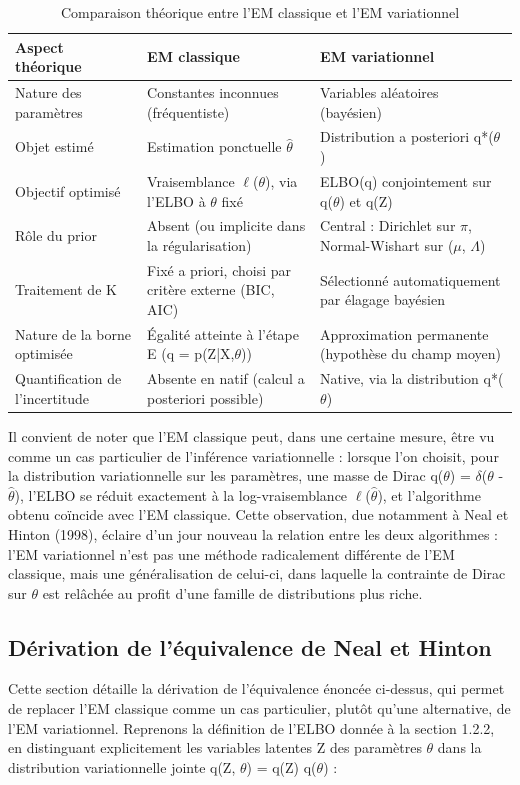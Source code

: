 \begin{table}[H]
\centering
\small
\setlength{\tabcolsep}{0.14cm}
\begin{tabular}{|p{4.84cm}|p{4.84cm}|p{4.84cm}|}
\hline
\textbf{Aspect théorique} & \textbf{EM classique} & \textbf{EM variationnel} \\
\hline
Nature des paramètres & Constantes inconnues (fréquentiste) & Variables aléatoires (bayésien) \\
\hline
Objet estimé & Estimation ponctuelle $\hat{\theta }$ & Distribution a posteriori q*($\theta $) \\
\hline
Objectif optimisé & Vraisemblance $\ell $($\theta $), via l'ELBO à $\theta $ fixé & ELBO(q) conjointement sur q($\theta $) et q(Z) \\
\hline
Rôle du prior & Absent (ou implicite dans la régularisation) & Central : Dirichlet sur $\pi $, Normal-Wishart sur ($\mu $, $\Lambda $) \\
\hline
Traitement de K & Fixé a priori, choisi par critère externe (BIC, AIC) & Sélectionné automatiquement par élagage bayésien \\
\hline
Nature de la borne optimisée & Égalité atteinte à l'étape E (q = p(Z|X,$\theta $)) & Approximation permanente (hypothèse du champ moyen) \\
\hline
Quantification de l'incertitude & Absente en natif (calcul a posteriori possible) & Native, via la distribution q*($\theta $) \\
\hline
\end{tabular}
\caption{Comparaison théorique entre l'EM classique et l'EM variationnel}
\label{tab:2_1}
\end{table}
Il convient de noter que l'EM classique peut, dans une certaine mesure, être vu comme un cas particulier de l'inférence variationnelle : lorsque l'on choisit, pour la distribution variationnelle sur les paramètres, une masse de Dirac q($\theta $) = $\delta $($\theta $ - $\hat{\theta }$), l'ELBO se réduit exactement à la log-vraisemblance $\ell $($\hat{\theta }$), et l'algorithme obtenu coïncide avec l'EM classique. Cette observation, due notamment à Neal et Hinton (1998), éclaire d'un jour nouveau la relation entre les deux algorithmes : l'EM variationnel n'est pas une méthode radicalement différente de l'EM classique, mais une généralisation de celui-ci, dans laquelle la contrainte de Dirac sur $\theta $ est relâchée au profit d'une famille de distributions plus riche.

\subsection{Dérivation de l'équivalence de Neal et Hinton}
Cette section détaille la dérivation de l'équivalence énoncée ci-dessus, qui permet de replacer l'EM classique comme un cas particulier, plutôt qu'une alternative, de l'EM variationnel. Reprenons la définition de l'ELBO donnée à la section 1.2.2, en distinguant explicitement les variables latentes Z des paramètres $\theta $ dans la distribution variationnelle jointe q(Z, $\theta $) = q(Z) q($\theta $) :

